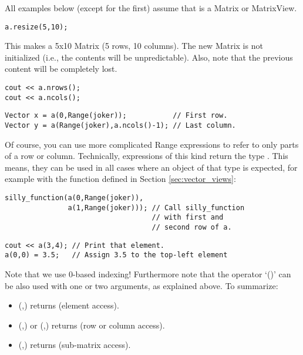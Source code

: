 
All examples below (except for the first) assume that  is a
Matrix or MatrixView.

\begin{verbatim}
a.resize(5,10);
\end{verbatim}
This makes  a 5x10 Matrix (5 rows, 10 columns). The new Matrix
is not initialized (i.e., the contents will be unpredictable). Also,
note that the previous content will be completely lost.

\begin{verbatim}
cout << a.nrows();
cout << a.ncols();
\end{verbatim}

\begin{verbatim}
Vector x = a(0,Range(joker));           // First row.
Vector y = a(Range(joker),a.ncols()-1); // Last column.
\end{verbatim}

Of course, you can use more complicated Range expressions to refer to
only parts of a row or column. Technically, expressions of this kind
return the type . This means, they can be used
in all cases where an object of that type is expected, for example
with the function defined in Section \ref{sec:vector_views}:

\begin{verbatim}
silly_function(a(0,Range(joker)),
               a(1,Range(joker))); // Call silly_function 
                                   // with first and 
                                   // second row of a.
\end{verbatim}

\begin{verbatim}
cout << a(3,4); // Print that element.
a(0,0) = 3.5;   // Assign 3.5 to the top-left element
\end{verbatim}

Note that we use 0-based indexing! Furthermore note that the operator
`()' can be also used with one or two  arguments, as
explained above. To summarize:

\begin{itemize}
\item (,) returns  (element access).
\item (,) or (,) returns
   (row or column access).
\item (,) returns 
  (sub-matrix access).
\end{itemize}

